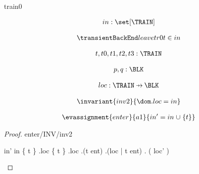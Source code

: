 \documentclass[12pt]{amsart}
\title{}
\author{}
\date{} %
\begin{document}
\maketitle
\tableofcontents


\begin{machine}{train0}

\newset{\TRAIN}
\newset{\BLK}
\newset{\LOC}

%
	\begin{align*}
\variable{		in : \set[\TRAIN]}
	\end{align*}
%



\begin{align*}
\transient{leave}{tr0}
{	t \in in	}
\end{align*}

\begin{align*}
\dummy{	t,t0,t1,t2,t3 : \TRAIN}
\end{align*}

\begin{align*}
\dummy{	p,q : \BLK}
\end{align*}


\begin{align*}
\variable{	loc : \TRAIN \pfun \BLK}
\end{align*}

\begin{align*}
\invariant{inv2}
{	\dom . loc = in	}
\end{align*}

\begin{align*}
\evassignment{enter}{a1}
{	in' = in \bunion \{ t \}	}
\end{align*}

\begin{proof}{enter/INV/inv2}
	\begin{calculation}
		in'
	\hint{=}{ \ref{a1} }
		in \bunion \{ t \}
	\hint{=}{ \ref{inv2} }
		\dom.loc \bunion \{ t \}
		\dom.loc \bunion \dom.(t \fun ent)
		\dom.(loc   |   t \fun ent)
	\hint{=}{ \ref{a2} }
		\dom. ( loc' )
	\end{calculation}
\end{proof}


\end{machine}
\end{document}

